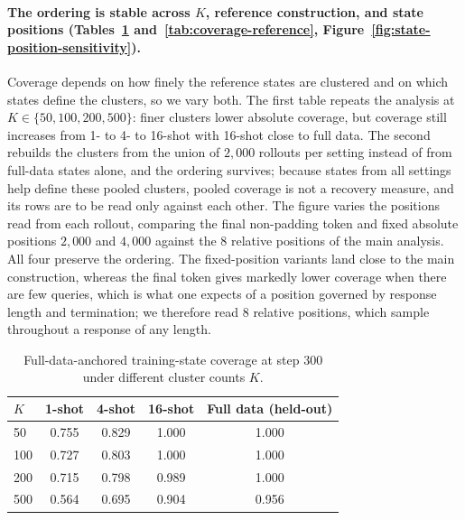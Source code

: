 \paragraph{The ordering is stable across \(K\), reference construction, and state positions (Tables~\ref{tab:coverage-k} and~\ref{tab:coverage-reference}, Figure~\ref{fig:state-position-sensitivity}).}
Coverage depends on how finely the reference states are clustered and on which states define the clusters, so we vary both. The first table repeats the analysis at \(K\in\{50,100,200,500\}\): finer clusters lower absolute coverage, but coverage still increases from 1- to 4- to 16-shot with 16-shot close to full data. The second rebuilds the clusters from the union of \(2{,}000\) rollouts per setting instead of from full-data states alone, and the ordering survives; because states from all settings help define these pooled clusters, pooled coverage is not a recovery measure, and its rows are to be read only against each other. The figure varies the positions read from each rollout, comparing the final non-padding token and fixed absolute positions \(2{,}000\) and \(4{,}000\) against the 8 relative positions of the main analysis. All four preserve the ordering. The fixed-position variants land close to the main construction, whereas the final token gives markedly lower coverage when there are few queries, which is what one expects of a position governed by response length and termination; we therefore read 8 relative positions, which sample throughout a response of any length.

\begin{table}[t]
    \centering
    \small
    \caption{Full-data-anchored training-state coverage at step \(300\) under different cluster counts \(K\).}
    \label{tab:coverage-k}
    \begin{tabular}{lcccc}
        \toprule
        \(K\)
        & 1-shot
        & 4-shot
        & 16-shot
        & Full data (held-out) \\
        \midrule
        50  & 0.755 & 0.829 & 1.000 & 1.000 \\
        100 & 0.727 & 0.803 & 1.000 & 1.000 \\
        200 & 0.715 & 0.798 & 0.989 & 1.000 \\
        500 & 0.564 & 0.695 & 0.904 & 0.956 \\
        \bottomrule
    \end{tabular}
\end{table}

